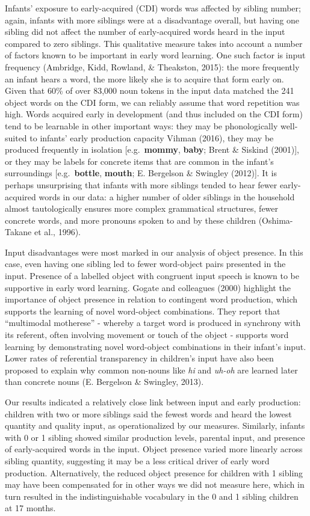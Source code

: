 \documentclass[
  english,
  man,floatsintext]{apa6}
\begin{document}
Infants' exposure to early-acquired (CDI) words was affected by sibling number; again, infants with more siblings were at a disadvantage overall, but having one sibling did not affect the number of early-acquired words heard in the input compared to zero siblings. This qualitative measure takes into account a number of factors known to be important in early word learning. One such factor is input frequency (Ambridge, Kidd, Rowland, \& Theakston, 2015): the more frequently an infant hears a word, the more likely she is to acquire that form early on. Given that 60\% of over 83,000 noun tokens in the input data matched the 241 object words on the CDI form, we can reliably assume that word repetition was high. Words acquired early in development (and thus included on the CDI form) tend to be learnable in other important ways: they may be phonologically well-suited to infants' early production capacity Vihman (2016), they may be produced frequently in isolation {[}e.g.~\textbf{mommy}, \textbf{baby}; Brent \& Siskind (2001){]}, or they may be labels for concrete items that are common in the infant's surroundings {[}e.g.~\textbf{bottle}, \textbf{mouth}; E. Bergelson \& Swingley (2012){]}. It is perhaps unsurprising that infants with more siblings tended to hear fewer early-acquired words in our data: a higher number of older siblings in the household almost tautologically ensures more complex grammatical structures, fewer concrete words, and more pronouns spoken to and by these children (Oshima-Takane et al., 1996).

Input disadvantages were most marked in our analysis of object presence. In this case, even having one sibling led to fewer word-object pairs presented in the input. Presence of a labelled object with congruent input speech is known to be supportive in early word learning. Gogate and colleagues (2000) highlight the importance of object presence in relation to contingent word production, which supports the learning of novel word-object combinations. They report that ``multimodal motherese'' - whereby a target word is produced in synchrony with its referent, often involving movement or touch of the object - supports word learning by demonstrating novel word-object combinations in their infant's input. Lower rates of referential transparency in children's input have also been proposed to explain why common non-nouns like \emph{hi} and \emph{uh-oh} are learned later than concrete nouns (E. Bergelson \& Swingley, 2013).

Our results indicated a relatively close link between input and early production: children with two or more siblings said the fewest words and heard the lowest quantity and quality input, as operationalized by our measures. Similarly, infants with 0 or 1 sibling showed similar production levels, parental input, and presence of early-acquired words in the input. Object presence varied more linearly across sibling quantity, suggesting it may be a less critical driver of early word production. Alternatively, the reduced object presence for children with 1 sibling may have been compensated for in other ways we did not measure here, which in turn resulted in the indistinguishable vocabulary in the 0 and 1 sibling children at 17 months.
\end{document}
